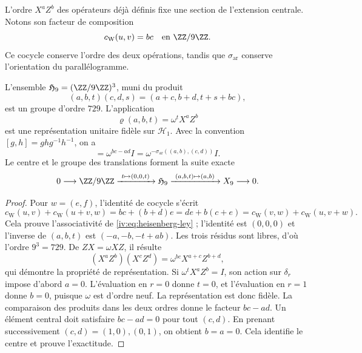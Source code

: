 L'ordre \(X^aZ^b\) des opérateurs déjà définis fixe une section de l'extension centrale. Notons son facteur de composition
\begin{equation}
 c_{\mathrm W}(u,v)=bc\quad\text{en }\ZZ/9\ZZ.
 \label{iv:eq:weyl-cociclo-polarizado}
\end{equation}
Ce cocycle conserve l'ordre des deux opérations, tandis que \(\sigma_{\mathrm{ar}}\) conserve l'orientation du parallélogramme.

\begin{proposition}
\label{iv:prop:heisenberg-orientado}
L’ensemble \(\mathfrak H_9=(\ZZ/9\ZZ)^3\), muni du produit
\begin{equation}
 (a,b,t)(c,d,s)=(a+c,b+d,t+s+bc),
 \label{iv:eq:heisenberg-ley}
\end{equation}
est un groupe d'ordre \(729\). L'application
\[
 \varrho(a,b,t)=\omega^tX^aZ^b
\]
est une représentation unitaire fidèle sur \(\mathcal H_1\).
Avec la convention \([g,h]=ghg^{-1}h^{-1}\), on a
\begin{equation}
 [\varrho(a,b,0),\varrho(c,d,0)]
 =\omega^{bc-ad}I
 =\omega^{-\sigma_{\mathrm{ar}}((a,b),(c,d))}I.
 \label{iv:eq:weyl-conmutador-orientado}
\end{equation}
Le centre et le groupe des translations forment la suite exacte
\[
 0\longrightarrow\ZZ/9\ZZ
 \xrightarrow{\ t\mapsto(0,0,t)\ }\mathfrak H_9
 \xrightarrow{\ (a,b,t)\mapsto(a,b)\ }X_9
 \longrightarrow0.
\]
\end{proposition}
\begin{proof}
Pour \(w=(e,f)\), l’identité de cocycle s’écrit
\[
 c_{\mathrm W}(u,v)+c_{\mathrm W}(u+v,w)
 =bc+(b+d)e
 =de+b(c+e)
 =c_{\mathrm W}(v,w)+c_{\mathrm W}(u,v+w).
\]
Cela prouve l’associativité de \eqref{iv:eq:heisenberg-ley} ; l’identité
est \((0,0,0)\) et l’inverse de \((a,b,t)\) est
\((-a,-b,-t+ab)\). Les trois résidus sont libres, d’où l’ordre
\(9^3=729\). De \(ZX=\omega XZ\), il résulte
\[
 (X^aZ^b)(X^cZ^d)=\omega^{bc}X^{a+c}Z^{b+d},
\]
qui démontre la propriété de représentation. Si \(\omega^tX^aZ^b=I\), son action sur \(\delta_r\) impose d'abord \(a=0\). L'évaluation en \(r=0\) donne \(t=0\), et l'évaluation en \(r=1\) donne \(b=0\), puisque \(\omega\) est d'ordre neuf. La représentation est donc fidèle. La comparaison des produits dans les deux ordres donne le facteur \(bc-ad\). Un élément central doit satisfaire \(bc-ad=0\) pour tout \((c,d)\). En prenant successivement \((c,d)=(1,0),(0,1)\), on obtient \(b=a=0\). Cela identifie le centre et prouve l'exactitude.
\end{proof}

